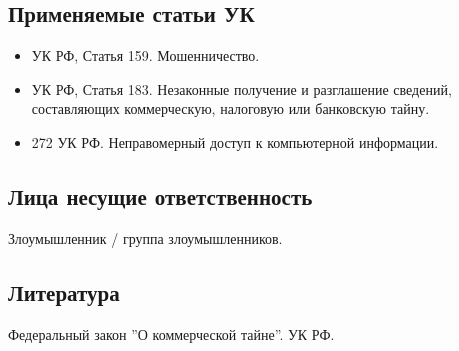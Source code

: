 \subsection*{Применяемые статьи УК}
\begin{itemize}
  \item УК РФ, Статья 159. Мошенничество.
  \item УК РФ, Статья 183. Незаконные получение и разглашение сведений,
    составляющих коммерческую, налоговую или банковскую тайну.
  \item 272 УК РФ. Неправомерный доступ к компьютерной информации.
\end{itemize}

\subsection*{Лица несущие ответственность}
Злоумышленник / группа злоумышленников.

\subsection*{Литература} Федеральный закон ''О коммерческой тайне''. УК РФ.
